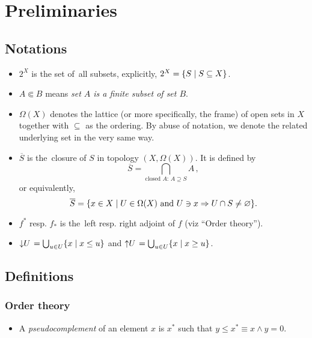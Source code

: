 \chapter*{Preliminaries}

\section*{Notations}

\begin{itemize}
\item $2^X$ is the set of~all subsets, explicitly, $2^X = \{ S \mid S\subseteq X
\}$.

\item $A \Subset B$ means {\sl set $A$ is a finite subset of set $B$\/}.

\item $\Omega(X)$ denotes the lattice (or more specifically, the frame) of open
sets in $X$ together with $\subseteq$ as the ordering. 
By abuse of notation, we denote the related underlying set in the very same
way.

\item $\overline{S}$ is the~closure of $S$ in topology $(X, \Omega(X))$.
It is defined by
\[
  \overline{S} = \bigcap_{ \text{closed } A\colon \, A\supseteq S} A
  \, ,
\]
or equivalently,
\[
  \overline{S} = \{ x \in X \mid U\in\Omega(X) \text{ and } U\owns x \Rightarrow
  U \cap S \ne \varnothing \}.
\]
\item $f^*$ resp. $f_*$ is the~left resp. right adjoint of $f$ (viz ``Order
theory'').
\item $\left\downarrow U \right. = \bigcup_{u\in U} \{x \mid x \le u\}$ and
$\left\uparrow U \right. = \bigcup_{u\in U} \{x \mid x \ge u\}$.

\end{itemize}

\section*{Definitions}

\subsection*{Order theory}

\begin{itemize}
\item A \emph{pseudocomplement} of an element $x$ is $x^*$ such that $y \le x^*
\equiv x \wedge y = 0$.
\end{itemize}

